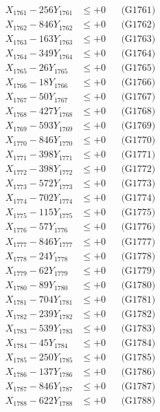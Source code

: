 \documentclass[a4paper,10pt]{article}
\begin{document}
{\begin{align}
\allowbreak
X_{1761} - 256Y_{1761} &\leq +0 && \text{(G1761)} \\
X_{1762} - 846Y_{1762} &\leq +0 && \text{(G1762)} \\
X_{1763} - 163Y_{1763} &\leq +0 && \text{(G1763)} \\
X_{1764} - 349Y_{1764} &\leq +0 && \text{(G1764)} \\
X_{1765} - 26Y_{1765} &\leq +0 && \text{(G1765)} \\
X_{1766} - 18Y_{1766} &\leq +0 && \text{(G1766)} \\
X_{1767} - 50Y_{1767} &\leq +0 && \text{(G1767)} \\
X_{1768} - 427Y_{1768} &\leq +0 && \text{(G1768)} \\
X_{1769} - 593Y_{1769} &\leq +0 && \text{(G1769)} \\
X_{1770} - 846Y_{1770} &\leq +0 && \text{(G1770)} \\
\allowbreak
X_{1771} - 398Y_{1771} &\leq +0 && \text{(G1771)} \\
X_{1772} - 398Y_{1772} &\leq +0 && \text{(G1772)} \\
X_{1773} - 572Y_{1773} &\leq +0 && \text{(G1773)} \\
X_{1774} - 702Y_{1774} &\leq +0 && \text{(G1774)} \\
X_{1775} - 115Y_{1775} &\leq +0 && \text{(G1775)} \\
X_{1776} - 57Y_{1776} &\leq +0 && \text{(G1776)} \\
X_{1777} - 846Y_{1777} &\leq +0 && \text{(G1777)} \\
X_{1778} - 24Y_{1778} &\leq +0 && \text{(G1778)} \\
X_{1779} - 62Y_{1779} &\leq +0 && \text{(G1779)} \\
X_{1780} - 89Y_{1780} &\leq +0 && \text{(G1780)} \\
\allowbreak
X_{1781} - 704Y_{1781} &\leq +0 && \text{(G1781)} \\
X_{1782} - 239Y_{1782} &\leq +0 && \text{(G1782)} \\
X_{1783} - 539Y_{1783} &\leq +0 && \text{(G1783)} \\
X_{1784} - 45Y_{1784} &\leq +0 && \text{(G1784)} \\
X_{1785} - 250Y_{1785} &\leq +0 && \text{(G1785)} \\
X_{1786} - 137Y_{1786} &\leq +0 && \text{(G1786)} \\
X_{1787} - 846Y_{1787} &\leq +0 && \text{(G1787)} \\
X_{1788} - 622Y_{1788} &\leq +0 && \text{(G1788)} \\

\end{align}}
\end{document}
